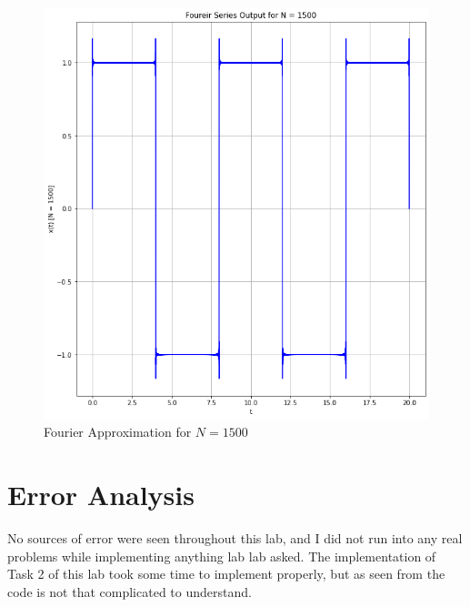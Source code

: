 \documentclass[12pt]{report}
\begin{document}
\begin{figure}[h!]
  \centering
  \includegraphics[scale=.5]{p1t2-5.png}
  \caption{Fourier Approximation for $N = 1500$}
  \label{fig: p1t2-5}
\end{figure}
\section{Error Analysis}\label{section: ErAn}
No sources of error were seen throughout this lab, and I did not run into any real problems while implementing anything lab lab asked. The implementation of 
Task 2 of this lab took some time to implement properly, but as seen from  the code is not that complicated to 
understand.
\end{document}
